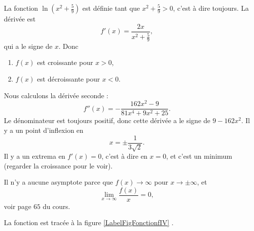 \begin{corrige}{4}

La fonction  $\ln(x^2+\frac{ 5 }{ 9 })$ est définie tant que $x^2+\frac{ 5 }{ 9 }>0$, c'est à dire toujours. La dérivée est
\begin{equation}
	f'(x)=\frac{ 2x }{ x^2+\frac{ 5 }{ 9 } },
\end{equation}
qui a le signe de $x$. Donc
\begin{enumerate}

\item $f(x)$ est croissante pour $x>0$,
\item $f(x)$ est décroissante pour $x<0$.
\end{enumerate}

Nous calculons la dérivée seconde :
\begin{equation}
	f''(x)=-\frac{ 162 x^2 -9}{ 81x^4+9x^2+25 }.
\end{equation}
Le dénominateur est toujours positif, donc cette dérivée a le signe de $9-162 x^2$. Il y a un point d'inflexion en
\begin{equation}
	x=\pm\frac{ 1 }{ 3\sqrt{2} }.
\end{equation}
Il y a un extrema en $f'(x)=0$, c'est à dire en $x=0$, et c'est un minimum (regarder la croissance pour le voir).

Il n'y a aucune asymptote parce que $f(x)\to \infty$ pour $x\to\pm\infty$, et 
\begin{equation}
	\lim_{x\to\infty}\frac{ f(x) }{ x }=0,
\end{equation}
voir page $65$ du cours.

La fonction est tracée à la figure \ref{LabelFigFonctionfIV}
\newcommand{\CaptionFigFonctionfIV}{La fonction de l'exercice \ref{exo4}}.


\end{corrige}
